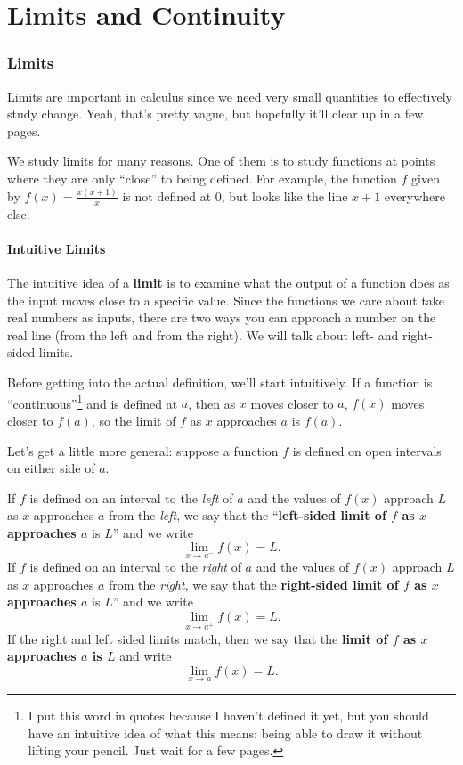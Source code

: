 \documentclass{article}
\theoremstyle{definition}
\theoremstyle{definition}
\begin{document}
\newpage
\part{Limits and Continuity}

\section{Limits}

Limits are important in calculus since we need very small quantities to effectively study change. Yeah, that's pretty vague, but hopefully it'll clear up in a few pages.

We study limits for many reasons. One of them is to study functions at points where they are only ``close'' to being defined. For example, the function $f$ given by $f(x)=\frac{x(x+1)}{x}$ is not defined at $0$, but looks like the line $x+1$ everywhere else.

\subsection{Intuitive Limits}

The intuitive idea of a \textbf{limit} is to examine what the output of a function does as the input moves close to a specific value. Since the functions we care about take real numbers as inputs, there are two ways you can approach a number on the real line (from the left and from the right). We will talk about left- and right-sided limits.

Before getting into the actual definition, we'll start intuitively. If a function is     ``continuous''\footnote{I put this word in quotes because I haven't defined it yet, but you should have an intuitive idea of what this means: being able to draw it without lifting your pencil. Just wait for a few pages.} and is defined at $a$, then as $x$ moves closer to $a$, $f(x)$ moves closer to $f(a)$, so the limit of $f$ as $x$ approaches $a$ is $f(a)$.


Let's get a little more general: suppose a function $f$ is defined on open intervals on either side of $a$.

If $f$ is defined on an interval to the \textit{left} of $a$ and the values of $f(x)$ approach $L$ as $x$ approaches $a$ from the \textit{left}, we say that the ``\textbf{left-sided limit of $f$ as $x$ approaches $a$} is $L$'' and we write $$\lim_{x\to a^-}f(x)=L.$$
If $f$ is defined on an interval to the \textit{right} of $a$ and the values of $f(x)$ approach $L$ as $x$ approaches $a$ from the \textit{right}, we say that the \textbf{right-sided limit of $f$ as $x$ approaches $a$} is $L$'' and we write
$$\lim_{x\to a^+}f(x)=L.$$
If the right and left sided limits match, then we say that the \textbf{limit of $f$ as $x$ approaches $a$ is $L$} and write $$\lim_{x\to a}f(x)=L.$$
\end{document}
